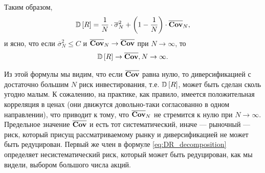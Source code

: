 Таким образом,
\begin{align} \label{eq:DR_decomposition}
	\mathbb{D}\left[R\right] = \frac{1}{N} \cdot \overline{\sigma}_N^2 + \left(1 - \frac{1}{N}\right) \cdot \overline{\textbf{Cov}}_N ,
\end{align}
и ясно, что если $\overline{\sigma}_N^2 \le C$ и $\overline{\textbf{Cov}}_N \rightarrow \overline{\textbf{Cov}}$ при $N \rightarrow \infty$, то
\begin{align}
	\mathbb{D}\left[R\right] \rightarrow \overline{\textbf{Cov}}, N \rightarrow \infty .
\end{align}

Из этой формулы мы видим, что если $\overline{\textbf{Cov}}$ равна нулю, то диверсификацией с достаточно большим $N$ риск инвестирования,
т.е. $\mathbb{D}\left[R\right]$, может быть сделан сколь угодно малым. К сожалению, на практике, как правило, имеется положительная корреляция в ценах
(они движутся довольно-таки согласованно в одном направлении), что приводит к тому, что
$\overline{\textbf{Cov}}_N$ не стремится к нулю при $N \rightarrow \infty$. Предельное значение $\overline{\textbf{Cov}}$ и есть тот систематический,
иначе --- рыночный --- риск, который присущ рассматриваемому рынку и диверсификацией не может быть редуцирован. Первый же член в формуле
\ref{eq:DR_decomposition} определяет несистематический риск, который может быть редуцирован, как мы видели, выбором большого числа акций.
